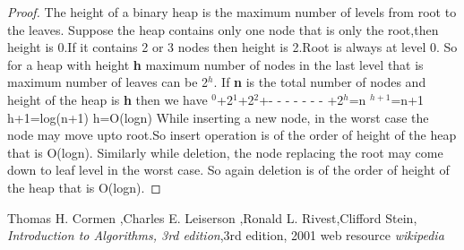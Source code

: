 \documentclass{amsart}
\theoremstyle{plain}
\numberwithin{equation}{section}
\begin{document}
\begin{proof}
The height of a binary heap is the maximum number of levels from root to the leaves.\newline
Suppose the heap contains only one node that is only the root,then height is 0.If it contains 2 or 3 nodes then height is 2.\newline Root is always at level 0. So for a heap with height \textbf{h} maximum number of nodes in the last level that is maximum number of leaves can be 2\(^h\).   
If \textbf{n} is the total number of nodes and height of the heap is \textbf{h} then we have\newline\newline
{}\(^0\)+2\(^1\)+2\(^2\)+- - - - - - - +2\(^h\)=n\newline
{}\(^{h+1}\)=n+1\newline
\indent h+1=log(n+1)\newline
\indent h=O(logn)\newline\newline
While inserting a new node, in the worst case the node may move upto root.So insert operation is of the order of height of the heap that is O(logn).\newline
Similarly while deletion, the node replacing the root may come down to leaf level in the worst case. So again deletion is of the order of height of the heap that is O(logn).\newline  


\end{proof}

\begin{thebibliography}{}
\bibitem {}Thomas H. Cormen ,Charles E. Leiserson ,Ronald L. Rivest,Clifford Stein, \textit{Introduction to Algorithms, 3rd edition},3rd edition, 2001
\bibitem{} web resource \textit{wikipedia}
\end{thebibliography}
\end{document}

